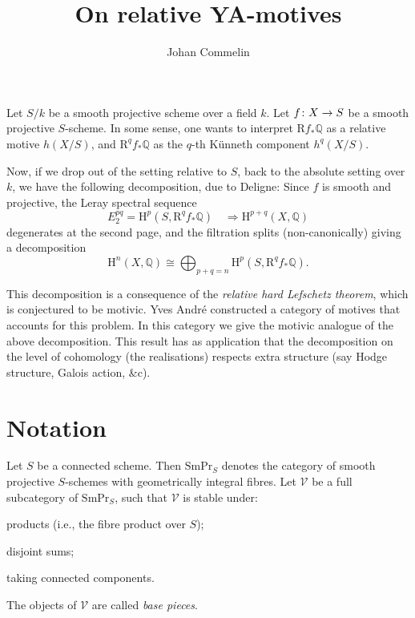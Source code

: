 \documentclass[a4paper,10pt]{article}
\title{On relative YA-motives}
\author{Johan Commelin}
\makeatletter
\newcommand*\map@arrow[1][]{\csname#1rightarrow\endcsname{}}
\newcommand*\function@textstyle[4][]{#2\colon#3\map@arrow[#1]#4}
\newcommand*\function[4][]{%
	\mathchoice
	{\function@textstyle[long#1]{#2}{#3}{#4}}
	{\function@textstyle[#1]{#2}{#3}{#4}}
	{\function@textstyle[#1]{#2}{#3}{#4}}
	{\function@textstyle[#1]{#2}{#3}{#4}}
}
\def\basepieces{\mathscr{V}}
\def\smpr{\mathrm{SmPr}}
\def\coh{\mathrm{H}}
\makeatother
\begin{document}
\maketitle

Let $S/k$ be a smooth projective scheme over a field $k$. Let
$\function{f}{X}{S}$ be a smooth projective $S$-scheme. In some sense, one
wants to interpret $\mathrm{R}f_{*}\mathbb{Q}$ as a relative motive $h(X/S)$,
and $\mathrm{R}^{q}f_{*}\mathbb{Q}$ as the $q$-th K\"{u}nneth component
$h^{q}(X/S)$.

Now, if we drop out of the setting relative to $S$, back to the absolute
setting over $k$, we have the following decomposition, due to Deligne:
Since $f$ is smooth and projective, the Leray spectral sequence
\[
	E_{2}^{pq} = \coh^{p}(S, \mathrm{R}^{q}f_{*}\mathbb{Q})
	\quad \Rightarrow \coh^{p+q}(X, \mathbb{Q})
\]
degenerates at the second page, and the filtration splits (non-canonically)
giving a decomposition
\[
	\coh^{n}(X, \mathbb{Q}) \cong \bigoplus_{p+q = n}
	\coh^{p}(S, \mathrm{R}^{q}f_{*}\mathbb{Q}).
\]

This decomposition is a consequence of the \emph{relative hard Lefschetz
theorem}, which is conjectured to be motivic. Yves Andr\'{e} constructed a
category of motives that accounts for this problem. In this category we give
the motivic analogue of the above decomposition. This result has as application
that the decomposition on the level of cohomology (the realisations) respects
extra structure (say Hodge structure, Galois action, \&c).

\section{Notation}

Let $S$ be a connected scheme. Then $\smpr_{S}$ denotes the category of smooth
projective $S$-schemes with geometrically integral fibres.
Let $\basepieces$ be
a full subcategory of $\smpr_{S}$, such that $\basepieces$ is stable under:
\begin{enumerate*}[label=(\alph*)] %
	\item products (i.e., the fibre product over $S$);
	\item disjoint sums;
	\item taking connected components.
\end{enumerate*} %
The objects of $\basepieces$ are called \emph{base pieces}.
\end{document}
